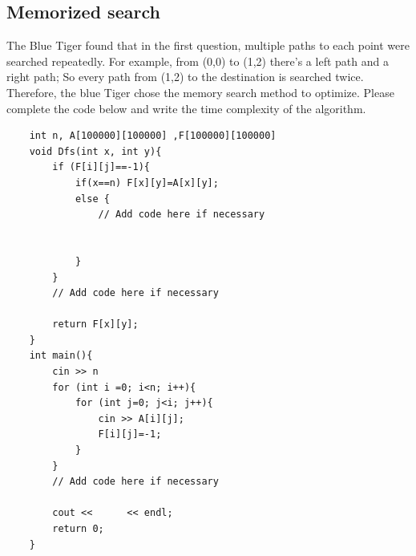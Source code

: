 \documentclass[11pt]{exam}
\begin{document}
\subsection{Memorized search}
The Blue Tiger found that in the first question, multiple paths to each point were searched repeatedly. 
For example, from (0,0) to (1,2) there's a left path and a right path; So every path from (1,2) to the destination is searched twice. 
Therefore, the blue Tiger chose the memory search method to optimize. Please complete the code below and write the time complexity of the algorithm.
\begin{lstlisting}
    int n, A[100000][100000] ,F[100000][100000]
    void Dfs(int x, int y){
        if (F[i][j]==-1){
            if(x==n) F[x][y]=A[x][y];
            else {
                // Add code here if necessary


            }
        }
        // Add code here if necessary

        return F[x][y];
    }
    int main(){
        cin >> n
        for (int i =0; i<n; i++){
            for (int j=0; j<i; j++){
                cin >> A[i][j];
                F[i][j]=-1;
            }
        }
        // Add code here if necessary

        cout <<      << endl;
        return 0;
    }
\end{lstlisting}
\begin{solution}
    \\ \hspace*{\fill} \\
    \\ \hspace*{\fill} \\
    \\ \hspace*{\fill} \\
    \\ \hspace*{\fill} \\
    \\ \hspace*{\fill} \\
    \\ \hspace*{\fill} \\
    \\ \hspace*{\fill} \\
    \\ \hspace*{\fill} \\
\end{solution}
\end{document}
